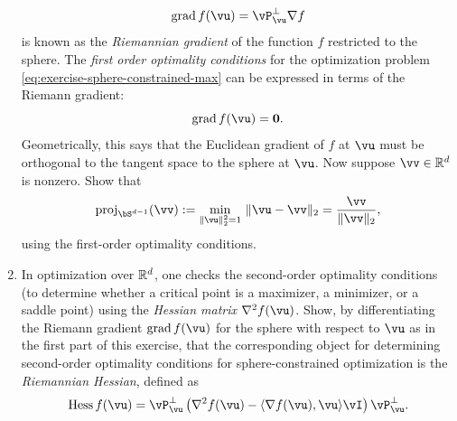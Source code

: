 \documentclass[../../book-main.tex]{subfiles}
\begin{document}
\begin{exercise}
\begin{enumerate}
\begin{equation}
        \mathrm{grad}\, f(\vu) = \vP_{\vu}^\perp \nabla f
        \end{equation}
        is known as the \textit{Riemannian gradient} of the function $f$ restricted to the sphere.
        The \textit{first order optimality conditions} for the optimization problem \eqref{eq:exercise-sphere-constrained-max} can be expressed in terms of the Riemann gradient:
        \begin{equation*}
            \mathrm{grad}\, f(\vu) = \mathbf{0}.
        \end{equation*}
        Geometrically, this says that the Euclidean gradient of $f$ at $\vu$ must be orthogonal to the tangent space to the sphere at $\vu$.
        Now suppose $\vv \in \R^d$ is nonzero. Show that
        \begin{equation*}
            \mathrm{proj}_{\bS^{d-1}}(\vv) :=
            \min_{\norm{\vu}_2^2 = 1}\, \norm{\vu - \vv}_2 
            =
            \frac{\vv}{\norm{\vv}_2},
        \end{equation*}
        using the first-order optimality conditions. 
        \item In optimization over $\mathbb{R}^d$, one checks the second-order optimality conditions (to determine whether a critical point is a maximizer, a minimizer, or a saddle point) using the \textit{Hessian matrix} $\nabla^2 f(\vu)$.
        Show, by differentiating the Riemann gradient $\mathrm{grad}\, f(\vu)$ for the sphere with respect to $\vu$ as in the first part of this exercise, that the corresponding object for determining second-order optimality conditions for sphere-constrained optimization is the \textit{Riemannian Hessian}, defined as
        \begin{equation}\label{eq:exercise-riemann-hess-sphere}
            \mathrm{Hess}\, f(\vu) = \vP_{\vu}^\perp \left( 
            \nabla^2 f(\vu) - \ip{\nabla f(\vu)}{\vu} \vI
            \right) \vP_{\vu}^\perp.
        \end{equation}
    \end{enumerate}
\end{exercise}
\end{document}
